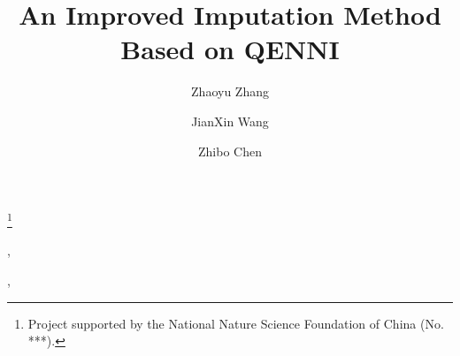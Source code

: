 \documentclass[print]{jicspack}
\begin{document}
\begin{premaker}


\title{An Improved Imputation Method Based on QENNI }
\thanks[label1]{Project supported by the National Nature Science Foundation of China (No. ***).}
\author[author1]{Zhaoyu Zhang},
\author[author2]{JianXin Wang},
\author[author3]{Zhibo Chen}

\address[author1]{School of Information Science And Technology, Beijing Forestry University, Beijing 100083, China}
\address[author2]{School of Information Science And Technology, Beijing Forestry University, Beijing 100083, China}
\address[author3]{School of Information Science And Technology, Beijing Forestry University, Beijing 100083, China}


\end{premaker}
\end{document}
